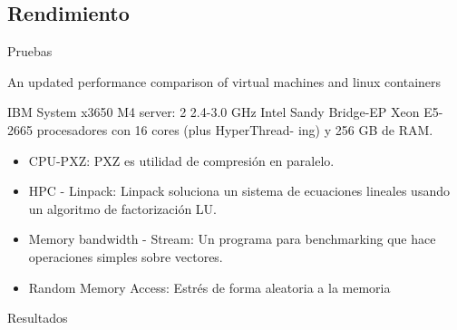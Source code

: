 \documentclass[compress]{beamer}
\begin{document}
\subsection{Rendimiento}



\begin{frame}{Pruebas}

An updated performance comparison of virtual machines and linux containers \cite{felter2014updated}

IBM System x3650 M4 server: 2 2.4-3.0 GHz Intel Sandy Bridge-EP Xeon E5-2665 procesadores con	 16 cores (plus HyperThread- ing) y 256 GB de RAM.
\begin{itemize}
	\item CPU-PXZ: PXZ es utilidad de compresión en paralelo. 
	\item HPC - Linpack: Linpack soluciona un sistema de ecuaciones lineales usando un algoritmo de factorización LU.
	\item Memory bandwidth - Stream: Un programa para benchmarking que hace operaciones simples sobre vectores.
	\item Random Memory Access: Estrés de forma aleatoria a la memoria 
\end{itemize}
\end{frame}

\begin{frame}{Resultados}
\begin{table}[h]
\centering
{}
\caption{Resultados}

\end{table}
\end{frame}
\end{document}
